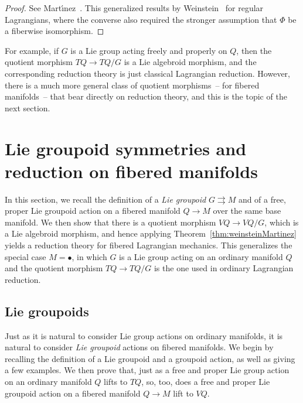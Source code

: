 \documentclass[10pt,a4paper]{amsart}
\numberwithin{equation}{section}
\begin{document}
\begin{proof} See Mart\'{\i}nez~\cite[Theorems 5--6]{Martinez2008}. This generalized results by Weinstein~\cite[Theorems~4.8 and~4.5, respectively]{Weinstein1996} for regular Lagrangians, where the converse also required the stronger assumption that $\Phi$ be a f\/iberwise isomorphism.
\end{proof}

For example, if $G$ is a Lie group acting freely and properly on $Q$, then the quotient morphism $ T Q \rightarrow T Q / G $ is a Lie algebroid morphism, and the corresponding reduction theory is just classical Lagrangian reduction. However, there is a much more general class of quotient morphisms~-- for f\/ibered manifolds~-- that bear directly on reduction theory, and this is the topic of the next section.

\section{Lie groupoid symmetries and reduction on f\/ibered manifolds}\label{sec:reduction}

In this section, we recall the def\/inition of a \emph{Lie groupoid} $ G \rightrightarrows M $ and of a free, proper Lie groupoid action on a f\/ibered manifold $ Q \rightarrow M $ over the same base manifold. We then show that there is a quotient morphism $ V Q \rightarrow V Q / G $, which is a Lie algebroid morphism, and hence applying Theorem~\ref{thm:weinsteinMartinez} yields a reduction theory for f\/ibered Lagrangian mechanics. This generalizes the special
case $ M = \bullet $, in which $G$ is a Lie group acting on an ordinary manifold $Q$ and the quotient morphism $ T Q \rightarrow T Q / G $ is the one used in ordinary Lagrangian reduction.

\subsection{Lie groupoids}

Just as it is natural to consider Lie group actions on ordinary manifolds, it is natural to consider \emph{Lie groupoid} actions on f\/ibered manifolds. We begin by recalling the def\/inition of a Lie groupoid and a groupoid action, as well as giving a few examples. We then prove that, just as a free and proper Lie group action on an ordinary manifold $Q$ lifts to $ T Q $, so, too, does a free and proper Lie groupoid action on a f\/ibered manifold $ Q \rightarrow M $
lift to $ V Q $.
\end{document}
